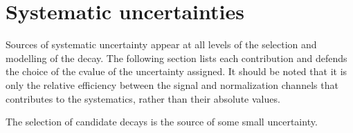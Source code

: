 \section{Systematic uncertainties}
\label{sec:dsphi:syst}

Sources of systematic uncertainty appear at all levels of the selection and modelling of the decay.
The following section lists each contribution and defends the choice of the cvalue of the
uncertainty assigned.
It should be noted that it is only the relative efficiency between the signal and normalization
channels that contributes to the systematics, rather than their absolute values.

The selection of candidate \btodsphi decays is the source of some small uncertainty.


%
%
%
%
%
%
%
%

